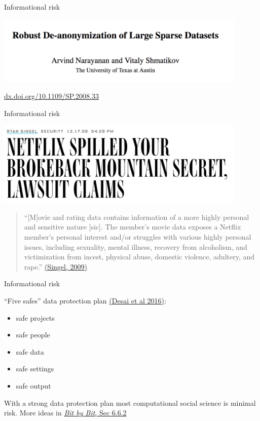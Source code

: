 \documentclass{beamer}
\def\vf{\vfill}
\begin{document}
\begin{frame}{Informational risk}

\begin{center}
\includegraphics[width=0.9\textwidth]{figures/narayanan_robust_2008_title.png}
\end{center}
\vf

\tiny{\url{dx.doi.org/10.1109/SP.2008.33}}
\end{frame}
\begin{frame}{Informational risk}

\begin{center}
\includegraphics[width=0.9\textwidth]{figures/singal_netflix_2009_title.png}
\end{center}


\begin{quote}
``[M]ovie and rating data contains information of a more highly personal and sensitive nature [sic]. The member's movie data exposes a Netflix member's personal interest and/or struggles with various highly personal issues, including sexuality, mental illness, recovery from alcoholism, and victimization from incest, physical abuse, domestic violence, adultery, and rape.''  \href{http://www.wired.com/2009/12/netflix-privacy-lawsuit/}{(Singel, 2009)}
\end{quote}

\end{frame}
\begin{frame}{Informational risk}

``Five safes'' data protection plan \href{http://rsss.anu.edu.au/sites/default/files/Ritchie_5safes.pdf}{(Desai et al 2016)}:
\begin{itemize}
\item safe projects
\item safe people
\item safe data
\item safe settings
\item safe output
\end{itemize}

With a strong data protection plan most computational social science is minimal risk. More ideas in \href{https://www.bitbybitbook.com/en/1st-ed/ethics/dilemmas/info-risk/}{\textit{Bit by Bit}, Sec 6.6.2}

\end{frame}
\end{document}
